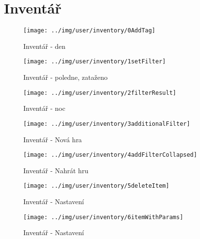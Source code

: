 
\section{Inventář}



\begin{figure}[h!]\centering
\texttt{[image: ../img/user/inventory/0AddTag]}

\caption{Inventář - den}
\label{fig:user_inventory_0AddTag}

\end{figure}

\begin{figure}[h!]\centering
\texttt{[image: ../img/user/inventory/1setFilter]}

\caption{Inventář - poledne, zataženo}
\label{fig:user_inventory_1setFilter}

\end{figure}

\begin{figure}[h!]\centering
\texttt{[image: ../img/user/inventory/2filterResult]}

\caption{Inventář - noc}
\label{fig:user_inventory_2filterResult}

\end{figure}


\begin{figure}[h!]\centering
\texttt{[image: ../img/user/inventory/3additionalFilter]}

\caption{Inventář - Nová hra}
\label{fig:user_inventory_3additionalFilter}

\end{figure}

\begin{figure}[h!]\centering
\texttt{[image: ../img/user/inventory/4addFilterCollapsed]}

\caption{Inventář - Nahrát hru}
\label{fig:user_inventory_4addFilterCollapsed}

\end{figure}


\begin{figure}[h!]\centering
\texttt{[image: ../img/user/inventory/5deleteItem]}

\caption{Inventář - Nastavení}
\label{fig:user_inventory_5deleteItem}

\end{figure}


\begin{figure}[h!]\centering
\texttt{[image: ../img/user/inventory/6itemWithParams]}

\caption{Inventář - Nastavení}
\label{fig:user_inventory_6itemWithParams}

\end{figure}